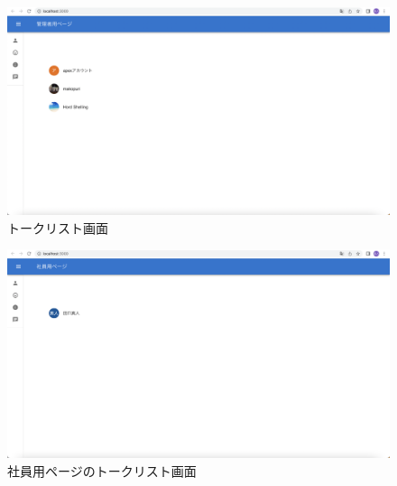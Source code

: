         \begin{figure}[!h]
          \begin{center}
            \includegraphics[scale=0.3, clip]{./img/chat5.png}
            \caption{トークリスト画面}
            \label{fig:図の名前}
          \end{center}
          \end{figure}

          \begin{figure}[!h]
            \begin{center}
              \includegraphics[scale=0.3, clip]{./img/chat6.png}
              \caption{社員用ページのトークリスト画面}
              \label{fig:図の名前}
            \end{center}
            \end{figure}

